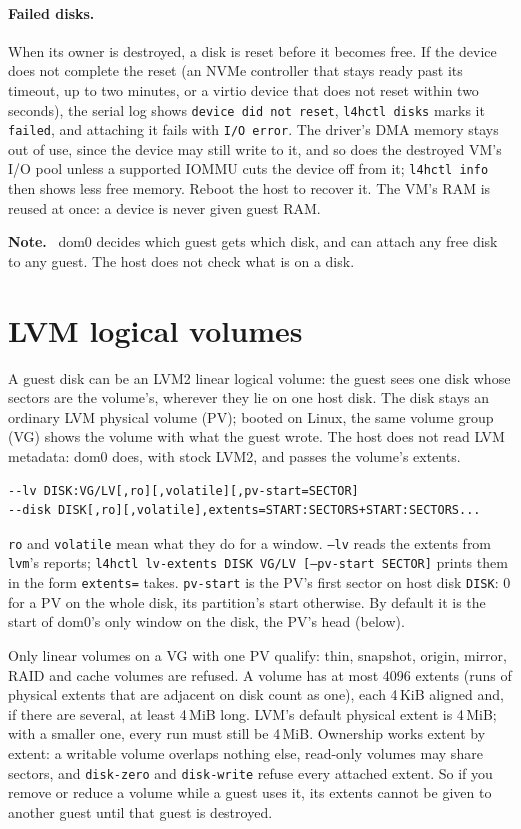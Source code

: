 \documentclass[11pt,a4paper]{report}
\newcommand{\cmd}[1]{\texttt{#1}}
\newenvironment{caveat}{\par\medskip\noindent\color{note}\textbf{Note.}\ }{\par\medskip}
\begin{document}
\paragraph{Failed disks.}\label{sec:disk-failed} When its owner is
destroyed, a disk is reset before it becomes free. If the device does not
complete the reset (an NVMe controller that stays ready past its timeout,
up to two minutes, or a virtio device that does not reset within two
seconds), the serial log shows \texttt{device did not reset}, \cmd{l4hctl
disks} marks it \texttt{failed}, and attaching it fails with \texttt{I/O
error}. The driver's DMA memory stays out of use, since the device may still
write to it, and so does the destroyed VM's I/O pool unless a supported IOMMU cuts
the device off from it; \cmd{l4hctl info} then shows less free memory.
Reboot the host to recover it. The VM's RAM is reused
at once: a device is never given guest RAM.

\begin{caveat}
dom0 decides which guest gets which disk, and can attach any free disk to
any guest. The host does not check what is on a disk.
\end{caveat}

\section{LVM logical volumes}
\label{sec:lvm}

A guest disk can be an LVM2 linear logical volume: the guest sees one
disk whose sectors are the volume's, wherever they lie on one host disk.
The disk stays an ordinary LVM physical volume (PV); booted on Linux, the
same volume group (VG) shows the volume with what the guest wrote. The host
does not read LVM metadata: dom0 does, with stock LVM2, and passes the
volume's extents.
\begin{lstlisting}
--lv DISK:VG/LV[,ro][,volatile][,pv-start=SECTOR]
--disk DISK[,ro][,volatile],extents=START:SECTORS+START:SECTORS...
\end{lstlisting}
\texttt{ro} and \texttt{volatile} mean what they do for a window.
\texttt{--lv} reads the extents from \cmd{lvm}'s reports; \cmd{l4hctl
lv-extents DISK VG/LV [--pv-start SECTOR]} prints them in the form
\texttt{extents=} takes. \texttt{pv-start} is the PV's first sector on
host disk \texttt{DISK}: 0 for a PV on the whole disk, its partition's start
otherwise. By default it is the start of dom0's only window on the disk,
the PV's head (below).

Only linear volumes on a VG with one PV qualify: thin, snapshot, origin,
mirror, RAID and cache volumes are refused. A volume has at most 4096
extents (runs of physical extents that are adjacent on disk count as one),
each 4\,KiB aligned and, if there are several, at least 4\,MiB long. LVM's
default physical extent is 4\,MiB; with a smaller one, every run must
still be 4\,MiB. Ownership works extent by extent: a writable volume
overlaps nothing else, read-only volumes may share sectors, and
\cmd{disk-zero} and \cmd{disk-write} refuse every attached extent. So if
you remove or reduce a volume while a guest uses it, its extents cannot
be given to another guest until that guest is destroyed.
\end{document}

